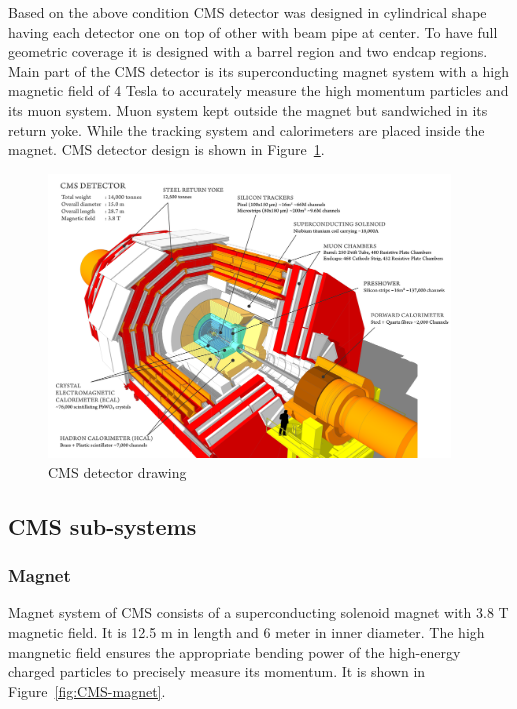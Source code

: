 Based on the above condition CMS detector was designed in cylindrical shape having each detector one on top of other with beam pipe at center. To have full geometric coverage it is designed with a barrel region and two endcap regions. Main part of the CMS detector is its superconducting magnet system with a high magnetic field of 4 Tesla to accurately measure the high momentum particles and its muon system. Muon system kept outside the magnet but sandwiched in its return yoke. While the tracking system and calorimeters are placed inside the magnet. CMS detector design is shown in Figure~\ref{fig:CMS-detector}.
\begin{figure}[!htbp]
	\centering
	\includegraphics[width=0.95\textwidth]{figures/LHC/cms_120918_03.png}
	\caption{CMS detector drawing}
	\label{fig:CMS-detector}
\end{figure}

\subsection{CMS sub-systems} %
\label{sub:cms_sub_systems}

\subsubsection{Magnet} %
\label{ssub:magnet}
Magnet system of CMS consists of a superconducting solenoid magnet with 3.8 T magnetic field. It is 12.5 m in length and 6 meter in inner diameter. The high mangnetic field ensures the appropriate bending power of the high-energy charged particles to precisely measure its momentum. It is shown in Figure~\ref{fig:CMS-magnet}.

